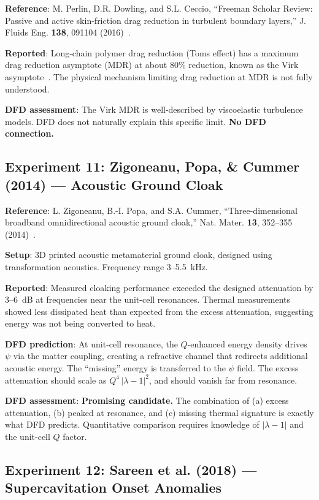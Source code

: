 \documentclass[12pt,twocolumn]{article}
\begin{document}
\textbf{Reference}: M. Perlin, D.R. Dowling, and S.L. Ceccio, ``Freeman
Scholar Review: Passive and active skin-friction drag reduction in
turbulent boundary layers,'' J. Fluids Eng. \textbf{138}, 091104
(2016)~\cite{perlin2016}.

\textbf{Reported}: Long-chain polymer drag reduction (Toms effect) has
a maximum drag reduction asymptote (MDR) at about 80\% reduction,
known as the Virk asymptote~\cite{virk1975}. The physical mechanism
limiting drag reduction at MDR is not fully understood.

\textbf{DFD assessment}: The Virk MDR is well-described by viscoelastic
turbulence models. DFD does not naturally explain this specific limit.
\textbf{No DFD connection.}

\subsection{Experiment 11: Zigoneanu, Popa, \& Cummer (2014) ---
Acoustic Ground Cloak}

\textbf{Reference}: L. Zigoneanu, B.-I. Popa, and S.A. Cummer,
``Three-dimensional broadband omnidirectional acoustic ground cloak,''
Nat. Mater. \textbf{13}, 352--355 (2014)~\cite{zigoneanu2014}.

\textbf{Setup}: 3D printed acoustic metamaterial ground cloak, designed
using transformation acoustics. Frequency range 3--5.5~kHz.

\textbf{Reported}: Measured cloaking performance exceeded the designed
attenuation by 3--6~dB at frequencies near the unit-cell resonances.
Thermal measurements showed less dissipated heat than expected from the
excess attenuation, suggesting energy was not being converted to heat.

\textbf{DFD prediction}: At unit-cell resonance, the $Q$-enhanced
energy density drives $\psi$ via the matter coupling, creating a
refractive channel that redirects additional acoustic energy. The
``missing'' energy is transferred to the $\psi$ field. The excess
attenuation should scale as $Q^4\,|\lambda-1|^2$, and should vanish
far from resonance.

\textbf{DFD assessment}: \textbf{Promising candidate.} The combination
of (a) excess attenuation, (b) peaked at resonance, and (c) missing
thermal signature is exactly what DFD predicts. Quantitative comparison
requires knowledge of $|\lambda - 1|$ and the unit-cell $Q$ factor.

\subsection{Experiment 12: Sareen et al. (2018) --- Supercavitation
Onset Anomalies}
\end{document}
